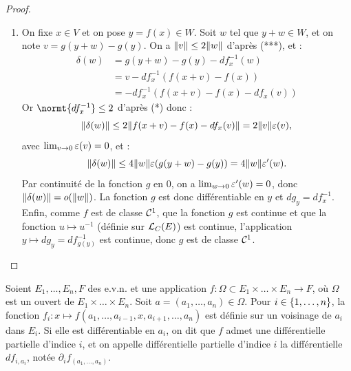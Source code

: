\begin{proof}
\begin{enumerate}[label=(\roman*)]
Notons $g: W \to V$ l'application inverse de $\restr{f}{V}$. On considère l'application $h$ du point précédent pour $y=0$, soit 
$h : B_r \to E, x \mapsto x - f(x)$. On remarque que $x = f(x) + h(x)$ pour tout $x$ dans $B_r$. Ainsi :
\[ \forall x, x' \in B_r, \norm{x-x'} \leq \norm{h(x)-h(x')} + \norm{f(x)-f(x')} \leq \dfrac12 \norm{x-x'} + \norm{f(x)-f(x')}, \]
donc $\norm{x-x'} \leq 2\norm{f(x)-f(x')}$. On en déduit :
\[ \forall y, y' \in W, \norm{g(y) - g(y')} \leq 2 \norm{f(g(y)) - f(g(y'))} = 2 \norm{y-y'} \qquad (***) \]
autrement dit, $g$ est lipschitzienne, donc continue.

\item

On fixe $x \in V$ et on pose $y = f(x) \in W$. Soit $w$ tel que $y+w \in W$, et on note $v = g(y+w) - g(y)$.
On a $\lVert v\rVert \leq 2 \lVert w\rVert$ d'après (***), et :
\begin{align*}
\delta(w) & = g(y+w) - g(y) - df_x^{-1}(w) \\
& = v - df_x^{-1}(f(x+v)-f(x)) \\
& = - df_x^{-1}(f(x+v)-f(x)-df_x(v)) 
\end{align*}
Or $\normt{df_x^{-1}} \leq 2$ d'après (*) donc :
\[ \lVert\delta(w)\rVert \leq 2 \lVert f(x+v)-f(x)-df_x(v)\rVert = 2 \lVert v\rVert \varepsilon(v) , \]
avec $\lim_{v \to 0} \varepsilon(v) = 0$, et :
\[ \lVert\delta(w)\rVert \leq 4 \lVert w\rVert \varepsilon(g(y+w)-g(y)) = 4 \lVert w\rVert \varepsilon'(w) . \]
Par continuité de la fonction $g$ en 0, on a $\lim_{w \to 0} \varepsilon'(w) = 0$, donc $\lVert\delta(w)\rVert = o(\lVert w\rVert)$.
La fonction $g$ est donc différentiable en $y$ et $dg_y = df_x^{-1}$. \\
Enfin, comme $f$ est de classe $\mathcal{C}^1$, que la fonction $g$ est continue et que la fonction $u \mapsto u^{-1}$ (définie sur $\mathcal{L}_C(E)$)
est continue, l'application $y \mapsto dg_y = df_{g(y)}^{-1}$ est continue, donc $g$ est de classe $\mathcal{C}^1$.

\end{enumerate}

\end{proof}

\begin{defn}
Soient $E_1, \dots, E_n, F$ des e.v.n. et une application $f: \Omega \subset E_1 \times \dots \times E_n \to F$, où $\Omega$ 
est un ouvert de $E_1 \times \dots \times E_n $. Soit $a=(a_1, \dots, a_n) \in \Omega$. 
Pour $i \in \{ 1, \dots, n \}$, la fonction $f_i : x \mapsto f(a_1, \dots, a_{i-1},x,a_{i+1}, \dots, a_n)$ est définie sur un voisinage de $a_i$ 
dans $E_i$. Si elle est différentiable en $a_i$, on dit que $f$ admet une différentielle partielle d'indice $i$, et on appelle différentielle
partielle d'indice $i$ la différentielle $df_{i,a_i}$, notée $\partial_i f_{(a_1, \dots, a_n)}$.
\end{defn}

